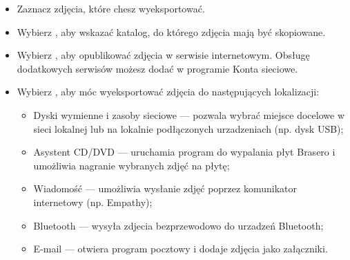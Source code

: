 \begin{itemize}
\item Zaznacz zdjęcia, które chesz wyeksportować.
\item Wybierz , aby wskazać katalog, do którego zdjęcia mają być skopiowane.
\item Wybierz , aby opublikować zdjęcia w serwisie internetowym. Obsługę dodatkowych serwisów możesz dodać w programie \textcolor{ubuntu_orange}{Konta sieciowe}.
\item Wybierz , aby móc wyeksportować zdjęcia do następujących lokalizacji:
	\begin{itemize}
	\item \textcolor{ubuntu_orange}{Dyski wymienne i zasoby sieciowe} --- pozwala wybrać miejsce docelowe w sieci lokalnej lub na lokalnie podłączonych urzadzeniach (np. dysk USB);
	\item \textcolor{ubuntu_orange}{Asystent CD/DVD} --- uruchamia program do wypalania płyt Brasero i umożliwia nagranie wybranych zdjęć na płytę;
	\item \textcolor{ubuntu_orange}{Wiadomość} --- umożliwia wysłanie zdjęć poprzez komunikator internetowy (np. Empathy);
	\item \textcolor{ubuntu_orange}{Bluetooth} --- wysyła zdjecia bezprzewodowo do urzadzeń Bluetooth;
	\item \textcolor{ubuntu_orange}{E-mail} --- otwiera program pocztowy i dodaje zdjęcia jako załączniki.
	\end{itemize}	
\end{itemize}
